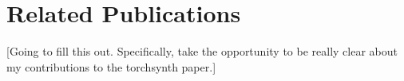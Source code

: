 \newpage
{}

\chapter*{Related Publications}

[Going to fill this out. Specifically, take the opportunity to be really clear about my contributions to the torchsynth paper.]
